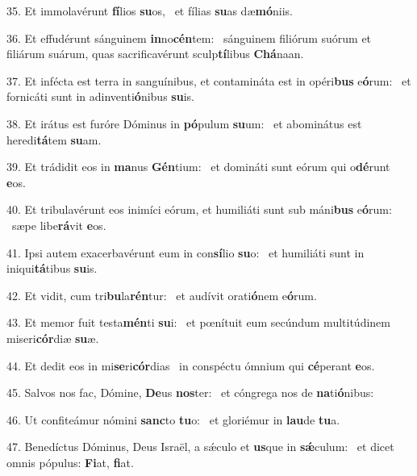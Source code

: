 35. Et immolavérunt \textbf{fí}lios \textbf{su}os, \ast\  et fílias \textbf{su}as dæ\textbf{mó}niis.\

36. Et effudérunt sánguinem \textbf{in}no\textbf{cén}tem: \ast\  sánguinem filiórum suórum et filiárum suárum, quas sacrificavérunt sculp\textbf{tí}libus \textbf{Chá}naan.\

37. Et infécta est terra in sanguínibus, et contamináta est in opéri\textbf{bus} e\textbf{ó}rum: \ast\  et fornicáti sunt in adinventi\textbf{ó}nibus \textbf{su}is.\

38. Et irátus est furóre Dóminus in \textbf{pó}pulum \textbf{su}um: \ast\  et abominátus est heredi\textbf{tá}tem \textbf{su}am.\

39. Et trádidit eos in \textbf{ma}nus \textbf{Gén}tium: \ast\  et domináti sunt eórum qui o\textbf{dé}runt \textbf{e}os.\

40. Et tribulavérunt eos inimíci eórum, et humiliáti sunt sub máni\textbf{bus} e\textbf{ó}rum: \ast\  sæpe libe\textbf{rá}vit \textbf{e}os.\

41. Ipsi autem exacerbavérunt eum in con\textbf{sí}lio \textbf{su}o: \ast\  et humiliáti sunt in iniqui\textbf{tá}tibus \textbf{su}is.\

42. Et vidit, cum tri\textbf{bu}la\textbf{rén}tur: \ast\  et audívit orati\textbf{ó}nem e\textbf{ó}rum.\

43. Et memor fuit testa\textbf{mén}ti \textbf{su}i: \ast\  et pœnítuit eum secúndum multitúdinem miseri\textbf{cór}diæ \textbf{su}æ.\

44. Et dedit eos in mi\textbf{se}ri\textbf{cór}dias \ast\  in conspéctu ómnium qui \textbf{cé}perant \textbf{e}os.\

45. Salvos nos fac, Dómine, \textbf{De}us \textbf{nos}ter: \ast\  et cóngrega nos de \textbf{na}ti\textbf{ó}nibus:\

46. Ut confiteámur nómini \textbf{sanc}to \textbf{tu}o: \ast\  et gloriémur in \textbf{lau}de \textbf{tu}a.\

47. Benedíctus Dóminus, Deus Israël, a sǽculo et \textbf{us}que in \textbf{sǽ}culum: \ast\  et dicet omnis pópulus: \textbf{Fi}at, \textbf{fi}at.\

